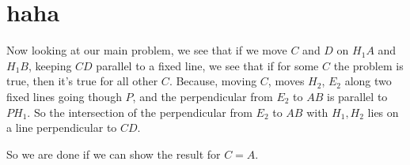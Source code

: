 \section{haha}

	


	\bigskip
	
	
	Now looking at our main problem, we see that if we move $ C $ and $ D $ on $ H_1A $ and $ H_1B $, keeping $ CD $ parallel to a fixed line, we see that if for some $ C $ the problem is true, then it's true for all other $ C $. Because, moving $ C $, moves $ H_2 $, $ E_2 $ along two fixed lines going though $ P $, and the perpendicular from $ E_2 $ to $ AB $ is parallel to $ PH_1 $. So the intersection of the perpendicular from $ E_2 $ to $ AB $ with $ H_1, H_2 $ lies on a line perpendicular to $ CD $. 
	
	\bigskip
	
	
	So we are done if we can show the result for $ C=A $. 
	
	
	
		
	
